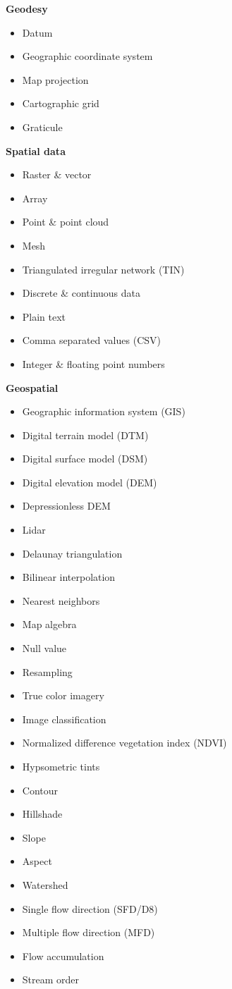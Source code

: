\documentclass[11pt,article,oneside]{memoir}
\begin{document}
\begin{multicols}{2}
\raggedright
\small
%
\textbf{Geodesy}
\begin{itemize}
\item Datum
\item Geographic coordinate system
\item Map projection
\item Cartographic grid
\item Graticule
\end{itemize}

\textbf{Spatial data}
\begin{itemize}
\item Raster \& vector
\item Array
\item Point \& point cloud
\item Mesh
\item Triangulated irregular network (TIN)
\item Discrete \& continuous data
\item Plain text
\item Comma separated values (CSV)
\item Integer \& floating point numbers
\end{itemize}

\textbf{Geospatial}
\begin{itemize}
\item Geographic information system (GIS)
\item Digital terrain model (DTM)
\item Digital surface model (DSM)
\item Digital elevation model (DEM)
\item Depressionless DEM
\item Lidar
\item Delaunay triangulation
\item Bilinear interpolation
\item Nearest neighbors
\item Map algebra
\item Null value
\item Resampling
\item True color imagery
\item Image classification
\item Normalized difference vegetation index (NDVI)
\item Hypsometric tints
\item Contour
\item Hillshade
\item Slope
\item Aspect
\item Watershed
\item Single flow direction (SFD/D8)
\item Multiple flow direction (MFD)
\item Flow accumulation
\item Stream order
\end{itemize}

\end{multicols}
\end{document}
